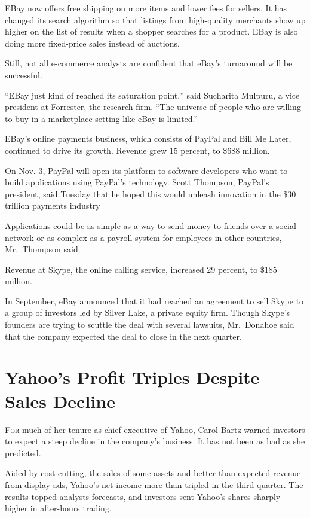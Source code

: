 ﻿\documentclass[12pt]{article}
\begin{document}
EBay now offers free shipping on more items and lower fees for sellers. It has changed its search
algorithm so that listings from high-quality merchants show up higher on the list of results when a
shopper searches for a product. EBay is also doing more fixed-price sales instead of auctions.

Still, not all e-commerce analysts are confident that eBay's turnaround will be successful.

``EBay just kind of reached its saturation point,'' said Sucharita Mulpuru, a vice president at
Forrester, the research firm. ``The universe of people who are willing to buy in a marketplace
setting like eBay is limited.''

EBay's online payments business, which consists of PayPal and Bill Me Later, continued to drive its
growth. Revenue grew 15 percent, to \$688 million.

On Nov. 3, PayPal will open its platform to software developers who want to build applications using
PayPal's technology. Scott Thompson, PayPal's president, said Tuesday that he hoped this would
unleash innovation in the \$30 trillion payments industry

Applications could be as simple as a way to send money to friends over a social network or as
complex as a payroll system for employees in other countries, Mr.~Thompson said.

Revenue at Skype, the online calling service, increased 29 percent, to \$185 million.

In September, eBay announced that it had reached an agreement to sell Skype to a group of investors
led by Silver Lake, a private equity firm. Though Skype's founders are trying to scuttle the deal
with several lawsuits, Mr.~Donahoe said that the company expected the deal to close in the next
quarter.

\section{Yahoo's Profit Triples Despite Sales Decline}

\lettrine{F}{or} much of her tenure as chief executive of Yahoo, Carol Bartz
warned investors to expect a steep decline in the company's business. It has not been as bad as she
predicted.

Aided by cost-cutting, the sales of some assets and better-than-expected revenue from display ads,
Yahoo's net income more than tripled in the third quarter. The results topped analysts forecasts,
and investors sent Yahoo's shares sharply higher in after-hours trading.
\end{document}

